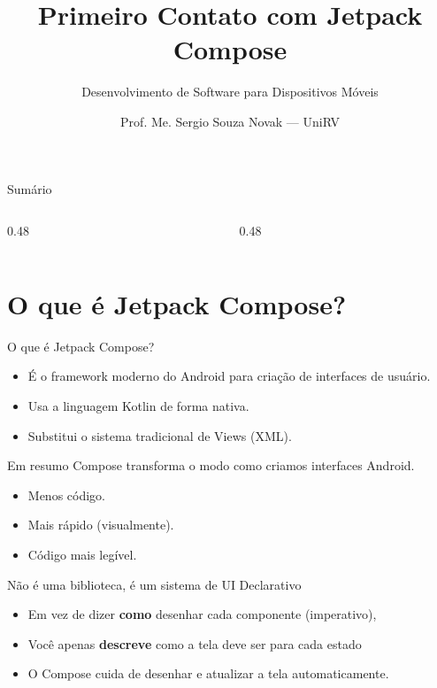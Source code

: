 \documentclass[aspectratio=169]{beamer}
\title[Primeiro Contato com Jetpack Compose]{Primeiro Contato com Jetpack Compose}
\subtitle{Desenvolvimento de Software para Dispositivos Móveis}
\author{Prof. Me. Sergio Souza Novak — UniRV}
\begin{document}
\frame[plain]{\titlepage}

\begin{frame}{Sumário}
  \footnotesize
  \begin{columns}[T]
    \begin{column}{0.48\textwidth}
      \tableofcontents[sections={1-4}]
    \end{column}
    \begin{column}{0.48\textwidth}
      \tableofcontents[sections={5-8}]
    \end{column}
  \end{columns}
\end{frame}

\section{O que é Jetpack Compose?}

\begin{frame}{O que é Jetpack Compose?}
  \begin{itemize}
    \item É o framework moderno do Android para criação de interfaces de usuário.
    \item Usa a linguagem Kotlin de forma nativa.
    \item Substitui o sistema tradicional de Views (XML).
  \end{itemize}

  \begin{block}{Em resumo}
    Compose transforma o modo como criamos interfaces Android.
    \begin{itemize}
      \item Menos código.
      \item Mais rápido (visualmente).
      \item Código mais legível.
    \end{itemize}
  \end{block}

  \begin{alertblock}{Não é uma biblioteca, é um sistema de UI Declarativo}
    \begin{itemize}
      \item Em vez de dizer 
      \textbf{como} desenhar cada componente (imperativo),
      \pause
      \item Você apenas \textbf{descreve} como a tela deve ser para cada estado
      \pause
      \item O Compose cuida de desenhar e atualizar a tela automaticamente.
    \end{itemize}
  \end{alertblock}
\end{frame}
\end{document}
